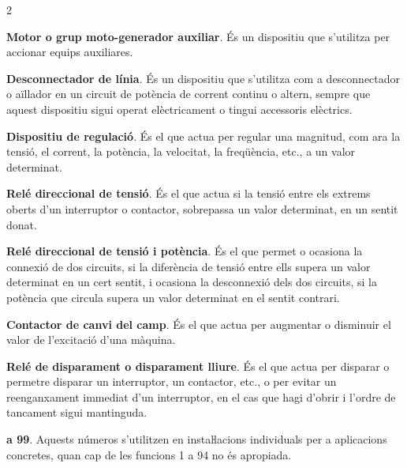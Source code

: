 \begin{multicols}{2}
\begin{list}{}
		\item[\textbf{88}]  
		\textbf{Motor o grup moto-generador auxiliar}. És un dispositiu que s'utilitza per
		accionar equips auxiliares.
		
		\item[\textbf{89}]  
		\textbf{Desconnectador de línia}. És
		un dispositiu que s'utilitza com a desconnectador o aïllador en un
		circuit de potència de corrent continu o altern, sempre que aquest
		dispositiu sigui operat elèctricament o tingui accessoris elèctrics.
		
		\item[\textbf{90}]   
		\textbf{Dispositiu de regulació}. És el que
		actua per  regular una magnitud, com ara la tensió, el corrent, la potència,
		la velocitat, la freqüència, etc., a un valor determinat.
		
		\item[\textbf{91}]   
		\textbf{Relé direccional de tensió}.
		És el que actua si la tensió entre els extrems oberts d'un
		interruptor o contactor, sobrepassa un valor determinat, en un
		sentit donat.
		
		\item[\textbf{92}]   
		\textbf{Relé direccional de tensió i potència}. És el que permet o ocasiona la connexió de
		dos circuits, si la diferència de tensió entre ells supera un
		valor determinat en un cert sentit, i ocasiona la desconnexió dels
		dos circuits, si la potència que circula supera un valor determinat
		en el sentit contrari.
		
		\item[\textbf{93}]   
		\textbf{Contactor de canvi del camp}. És el
		que actua per augmentar o disminuir el valor de l'excitació
		d'una màquina.
		
		\item[\textbf{94}]   
		\textbf{Relé de disparament o disparament lliure}. És el que actua per disparar o permetre disparar un
		interruptor, un contactor, etc., o per evitar un reenganxament
		immediat d'un interruptor, en el cas que hagi d'obrir i l'ordre de
		tancament sigui mantinguda.
		
		\item[\textbf{95}] \textbf{a 99}. Aquests números s'utilitzen en instaŀlacions
		individuals per a aplicacions concretes, quan cap de les funcions 1
		a 94 no és apropiada.
		
	\end{list}
\end{multicols}


